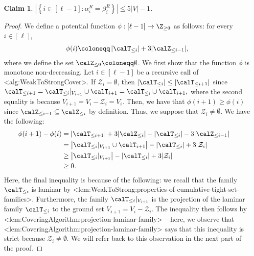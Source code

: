 \documentclass{article}
\def\Cref#1{<#1>}%
\newtheorem{claim}{Claim}[section]
\newcommand{\zeros}{\ensuremath{\mathcal{Z}}\xspace}
\newcommand{\maximalTightSetFamily}[1]{\ensuremath{\calT_{#1}}\xspace}
\newcommand{\cumulativeMaximalTightSetFamily}[1]{\ensuremath{\calT_{\leq #1}}}
\newcommand{\projCumulativeMaximalTightSetFamily}[2]{\ensuremath{\calT_{\leq #1}|_{V_{#2}}}}
\newcommand{\cumulativeZeros}[1]{\ensuremath{\calZ_{\leq #1}}\xspace}
\begin{document}
\begin{claim}\label{claim:WeakToStrong:hyperedge-support-size:alpha^R=weight-of-added-hyperedge}
$\left|\left\{i \in [\ell-1] : \alpha_i^R = \beta_i^R\right\}\right| \leq 5|V| - 1$.
\end{claim}
\begin{proof}
We define a potential function $\phi:[\ell - 1] \rightarrow\Z_{\geq 0}$ as follows: for every $i \in [\ell]$,
    $$\phi(i) \coloneqq  \left|\cumulativeMaximalTightSetFamily{i}\right| + 3|\cumulativeZeros{i-1}|,$$
    where we define the set $\cumulativeZeros{0} \coloneqq  \emptyset$.
We first show that the function $\phi$ is monotone non-decreasing.
Let $i \in [\ell -1]$ be a recursive call of \Cref{alg:WeakToStrongCover}. If $\zeros_i = \emptyset$, then $|\cumulativeMaximalTightSetFamily{i}| \leq |\cumulativeMaximalTightSetFamily{i+1}|$ since $\cumulativeMaximalTightSetFamily{i+1} = \cumulativeMaximalTightSetFamily{i} |_{V_{i+1}}\cup \maximalTightSetFamily{i+1} = \cumulativeMaximalTightSetFamily{i}  \cup \maximalTightSetFamily{i+1},$   where the second equality is because $V_{i+1} = V_i - \zeros_i = V_i$. Then, we have that $\phi(i+1) \geq \phi(i)$ since $\cumulativeZeros{i-1} \subseteq \cumulativeZeros{i}$ by definition. Thus, we suppose that $\zeros_i \not = \emptyset$. We have the following: 
\begin{align*}
    \phi(i+1) - \phi(i)& = |\cumulativeMaximalTightSetFamily{i+1}| + 3 |\cumulativeZeros{i}| - |\cumulativeMaximalTightSetFamily{i}| - 3|\cumulativeZeros{i-1}|&\\
    & = \left|\cumulativeMaximalTightSetFamily{i}|_{V_{i+1}}\cup \maximalTightSetFamily{i+1}  \right| - |\cumulativeMaximalTightSetFamily{i}| + 3|\zeros_{i}|&\\
    &\geq \left|\cumulativeMaximalTightSetFamily{i}|_{V_{i+1}}\right| - |\cumulativeMaximalTightSetFamily{i}| + 3|\zeros_{i}|&\\
    & \geq  0.&
\end{align*}
Here, the final inequality is because of the following: we recall that the family $\cumulativeMaximalTightSetFamily{i}$ is laminar by \Cref{lem:WeakToStrong:properties-of-cumulative-tight-set-families}. Furthermore, the family $\projCumulativeMaximalTightSetFamily{i}{i+1}$ is the projection of the laminar family $\cumulativeMaximalTightSetFamily{i}$ to the ground set $V_{i+1} = V_i - \zeros_i$. The inequality then follows by \Cref{lem:CoveringAlgorithm:projection-laminar-family}  --  here, we observe that  \Cref{lem:CoveringAlgorithm:projection-laminar-family} says that this inequality is strict because $\zeros_i \not = \emptyset$. We will refer back to this observation in the next part of the proof.


\end{proof}
\end{document}
